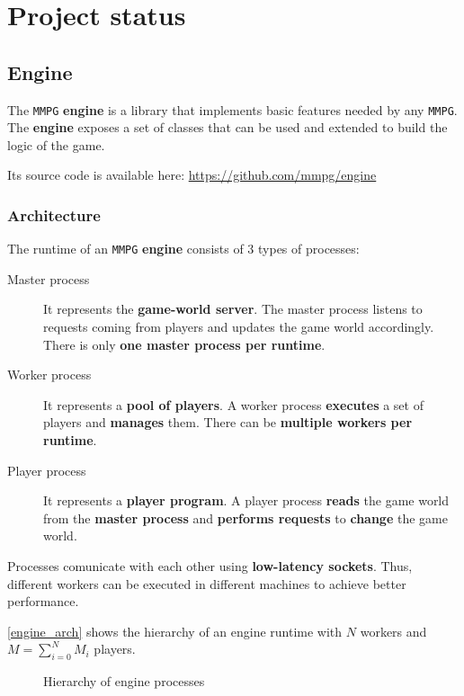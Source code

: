 \documentclass[a4paper,11pt]{article}
\begin{document}
\section{Project status}
\label{components}
\subsection{Engine}
The \texttt{MMPG} \textbf{engine} is a library that implements basic features needed by any \texttt{MMPG}. The \textbf{engine} exposes a set
of classes that can be used and extended to build the logic of the game.

Its source code is available here: \url{https://github.com/mmpg/engine}
\subsubsection{Architecture}
The runtime of an \texttt{MMPG} \textbf{engine} consists of 3 types of processes:
\begin{description}
\item[Master process]
It represents the \textbf{game-world server}. The master process listens to requests coming from
players and updates the game world accordingly. There is only \textbf{one master process per runtime}.
\item[Worker process]
It represents a \textbf{pool of players}. A worker process \textbf{executes} a set of players and
  \textbf{manages} them. There can be \textbf{multiple workers per runtime}.
\item[Player process]
It represents a \textbf{player program}. A player process \textbf{reads} the game world from the
  \textbf{master process} and \textbf{performs requests} to \textbf{change} the game world.
\end{description}
Processes comunicate with each other using \textbf{low-latency sockets}. Thus, different workers can be executed
in different machines to achieve better performance.

\autoref{engine_arch} shows the hierarchy of an engine runtime with $N$ workers and $M = \sum_{i=0}^{N} M_i$ players.
\begin{figure}[H]
\noindent\resizebox{\textwidth}{!}{

}
\caption{Hierarchy of engine processes}
\label{engine_arch}
\end{figure}
\end{document}
